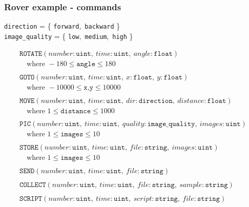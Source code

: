 \begin{frame}
  \frametitle{Rover example - commands} \small

{\scriptsize
\begin{center}
\texttt{direction} = \{ \texttt{forward},\ \texttt{backward} \} \\[0.5ex]
\texttt{image\_quality} = \{ \texttt{low},\ \texttt{medium},\ \texttt{high} \}
\end{center}
}

{\scriptsize
\[
\begin{array}{l}
\texttt{ROTATE}(number\!:\!\texttt{uint},\ time\!:\!\texttt{uint},\ angle\!:\!\texttt{float}) \\
\quad \text{where } -180 \le \texttt{angle} \le 180 \\ \\[0.5ex]
%
\texttt{GOTO}(number\!:\!\texttt{uint},\ time\!:\!\texttt{uint},\ x\!:\!\texttt{float},\ y\!:\!\texttt{float}) \\
\quad \text{where } -10000 \le \texttt{x,y} \le 10000 \\ \\[0.5ex]
%
\texttt{MOVE}(number\!:\!\texttt{uint},\ time\!:\!\texttt{uint},\ dir\!:\!\texttt{direction},\ distance\!:\!\texttt{float}) \\
\quad \text{where } 1 \le \texttt{distance} \le 1000 \\ \\[0.5ex]
%
\texttt{PIC}(number\!:\!\texttt{uint},\ time\!:\!\texttt{uint},\ quality\!:\!\texttt{image\_quality},\ images\!:\!\texttt{uint}) \\
\quad \text{where } 1 \le \texttt{images} \le 10 \\ \\[0.5ex]
%
\texttt{STORE}(number\!:\!\texttt{uint},\ time\!:\!\texttt{uint},\ file\!:\!\texttt{string},\ images\!:\!\texttt{uint}) \\
\quad \text{where } 1 \le \texttt{images} \le 10 \\ \\[0.5ex]
%
\texttt{SEND}(number\!:\!\texttt{uint},\ time\!:\!\texttt{uint},\ file\!:\!\texttt{string}) \\ \\[0.5ex]
%
\texttt{COLLECT}(number\!:\!\texttt{uint},\ time\!:\!\texttt{uint},\ file\!:\!\texttt{string},\ sample\!:\!\texttt{string}) \\ \\[0.5ex]
%
\texttt{SCRIPT}(number\!:\!\texttt{uint},\ time\!:\!\texttt{uint},\ script\!:\!\texttt{string},\ file\!:\!\texttt{string}) \\[0.5ex]
\end{array}
\]
}

\end{frame}

